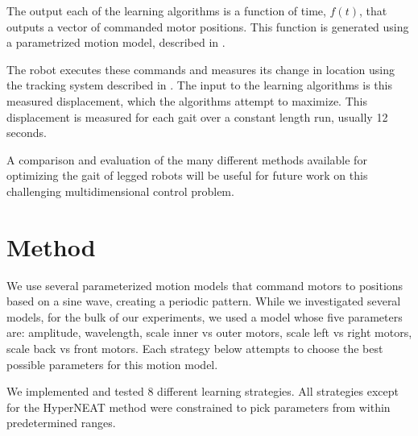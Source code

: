 The output each of the learning algorithms is a function of time,
$f(t)$, that outputs a vector of commanded motor positions.  This
function is generated using a parametrized motion model, described in
.

The robot executes these commands and measures its change in location
using the tracking system described in .  The input
to the learning algorithms is this measured displacement, which the
algorithms attempt to maximize. This displacement is measured for each
gait over a constant length run, usually 12 seconds.

A comparison and evaluation of the many different methods available
for optimizing the gait of legged robots will be useful for future
work on this challenging multidimensional control problem.



\section{Method}


We use several parameterized motion models that command motors to
positions based on a sine wave, creating a periodic pattern.  While we
investigated several models, for the bulk of our experiments, we used
a model whose five parameters are: amplitude, wavelength, scale inner
vs outer motors, scale left vs right motors, scale back vs front
motors. Each strategy below attempts to choose the best possible
parameters for this motion model.  

We implemented and tested 8 different learning strategies.  All
strategies except for the HyperNEAT method\cite{clune} were
constrained to pick parameters from within predetermined ranges.

